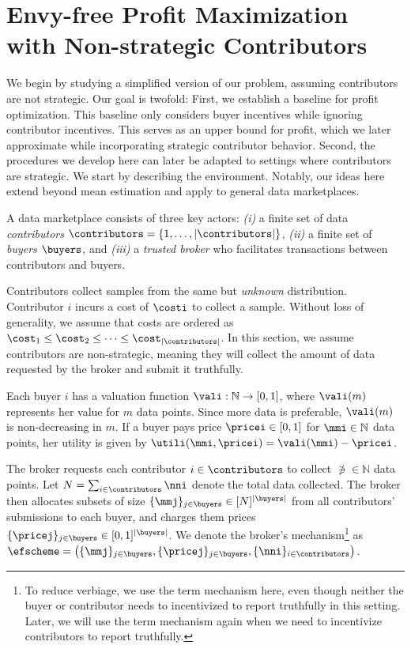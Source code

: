 \section{Envy-free Profit Maximization with Non-strategic Contributors}
\label{sec:buyerside}

We begin by studying a simplified version of our problem, assuming contributors are not strategic. Our goal is twofold:  
First, we establish a baseline for profit optimization. This baseline  only
considers buyer incentives while ignoring contributor incentives. This serves as an upper bound for profit, which we later approximate while incorporating strategic contributor behavior.  
Second, the procedures we develop here can later be adapted to settings where contributors are strategic.  
We start by describing the environment. Notably, our ideas here extend beyond mean estimation and apply to general data marketplaces.  



A data marketplace consists of three key actors:  
\emph{(i)} a finite set of data \emph{contributors} $\contributors = \{1,\dots,|\contributors|\}$,  
\emph{(ii)} a finite set of \emph{buyers} $\buyers$, and  
\emph{(iii)} a \emph{trusted broker} who facilitates transactions between contributors and buyers.  

Contributors collect samples from the same but \emph{unknown} distribution. Contributor $i$ incurs a cost of $\costi$ to collect a sample.  
Without loss of generality, we assume that costs are ordered as $\cost_1 \leq \cost_2 \leq \dots \leq \cost_{|\contributors|}$.  
In this section, we assume contributors are non-strategic, meaning they
will collect the  amount of data requested by the broker and submit it truthfully.  


Each buyer $i$ has a valuation function $\vali: \mathbb{N} \to [0,1]$, where $\vali(m)$ represents her value for $m$ data points.  
Since more data is preferable, $\vali(m)$ is non-decreasing in $m$.  
If a buyer pays price $\pricei \in [0,1]$ for $\mmi \in \mathbb{N}$ data points, her
utility is given by  
$\utili(\mmi, \pricei) = \vali(\mmi) - \pricei$.

The broker requests each contributor $i\in\contributors$ to collect $\nni \in \mathbb{N}$ data points.  
Let $N = \sum_{i\in\contributors} \nni$ denote the total data collected.  
The broker then allocates subsets of size $\{\mmj\}_{j\in\buyers} \in [N]^{|\buyers|}$ from all contributors' submissions to each buyer, and charges them prices $\{\pricej\}_{j \in \buyers} \in [0,1]^{|\buyers|}$.  
We denote the broker's mechanism\footnote{To reduce verbiage, we use the term mechanism here, even though neither the buyer or contributor needs to incentivized to report truthfully in this setting. Later, we will use the term mechanism again when we need to incentivize
contributors to report truthfully.} as  
$\efscheme = \big(\{\mmj\}_{j\in\buyers}, \{\pricej\}_{j \in \buyers}, \{\nni\}_{i\in\contributors}\big)$.


